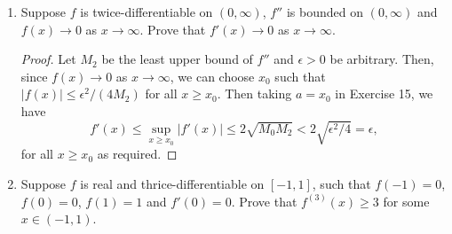 \begin{enumerate}[1.]
    \begin{proof}
        If $h > 0$, setting $(\alpha, \beta, n) = (x, x+2h, 2)$ in Taylor's theorem shows that for some $\xi \in (x, x+2h)$, 
        \[
            f(x+2h) = f(x) + 2h f'(x) + \frac{(2h)^2}{2!} f''(\xi)
        \]
        and thus
        \[
            f'(x) = \frac{1}{2h} [f(x+2h) - f(x)] - h f''(\xi)
        \]
        so
        \[
            |f'(x)| \le M_1 \le \frac{1}{h} M_0 + hM_2.
        \]
        Now the right side attains its minimum by AM-GM at
        \[
            \frac{1}{h} M_0 + hM_2 \ge 2 \sqrt{\frac{1}{h} M_0 \cdot h M_2} = 2\sqrt{M_0M_2},
        \]
        so $M_1 \le 2\sqrt{M_0M_2}$ and the result follows.
    \end{proof}
\item %
    Suppose $f$ is twice-differentiable on $(0, \infty)$, $f''$ is bounded on $(0, \infty)$ and $f(x) \to 0$ as $x \to \infty$. Prove that $f'(x) \to 0$ as $x \to \infty$.

    \begin{proof}
        Let $M_2$ be the least upper bound of $f''$ and $\epsilon > 0$ be arbitrary. Then, since $f(x) \to 0$ as $x \to \infty$, we can choose $x_0$ such that $|f(x)| \le \epsilon^2/(4M_2)$ for all $x \ge x_0$. Then taking $a = x_0$ in Exercise 15, we have
        \[
            f'(x) \le \sup_{x \ge x_0} |f'(x)| \le 2\sqrt{M_0M_2} < 2\sqrt{\epsilon^2/4} = \epsilon,
        \]
        for all $x \ge x_0$ as required.
    \end{proof}
\item %
    Suppose $f$ is real and thrice-differentiable on $[-1, 1]$, such that $f(-1) = 0$, $f(0) = 0$, $f(1) = 1$ and $f'(0) = 0$. Prove that $f^{(3)}(x) \ge 3$ for some $x \in (-1, 1)$.
    

\end{enumerate}
